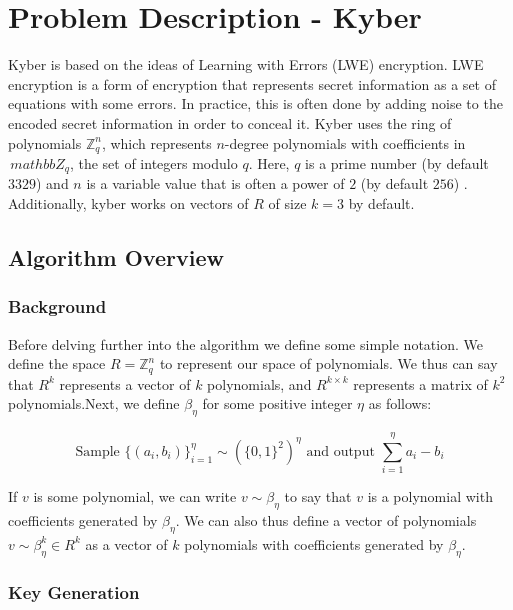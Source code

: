 
\section*{Problem Description - Kyber}

Kyber is based on the ideas of Learning with Errors (LWE) encryption. LWE encryption is a form of encryption that represents secret information as a set of equations with some errors. In practice, this is often done by adding noise to the encoded secret information in order to conceal it. Kyber uses the ring of polynomials $\mathbb{Z}^n_q$, which represents $n$-degree polynomials with coefficients in $\,mathbb{Z}_q$, the set of integers modulo $q$. Here, $q$ is a prime number (by default $3329$) and $n$ is a variable value that is often a power of $2$ (by default $256$) \cite{crystals-kyber}. Additionally, kyber works on vectors of $R$ of size $k = 3$ by default.



\subsection*{Algorithm Overview}

\subsubsection*{Background}

Before delving further into the algorithm we define some simple notation. We define the space $R = \mathbb{Z}^n_q$ to represent our space of polynomials. We thus can say that $R^k$ represents a vector of $k$ polynomials, and $R^{k \times k}$ represents a matrix of $k^2$ polynomials.Next, we define $\beta_\eta$ for some positive integer $\eta$ as follows:

$$\text{Sample }\{(a_i, b_i)\}^\eta_{i=1} \sim (\{0, 1\}^2)^\eta\text{ and output }\sum_{i=1}^\eta a_i - b_i$$

If $v$ is some polynomial, we can write $v \sim \beta_\eta$ to say that $v$ is a polynomial with coefficients generated by $\beta_\eta$. We can also thus define a vector of polynomials $v \sim \beta_\eta^k \in R^k$ as a vector of $k$ polynomials with coefficients generated by $\beta_\eta$.

\subsubsection*{Key Generation}

